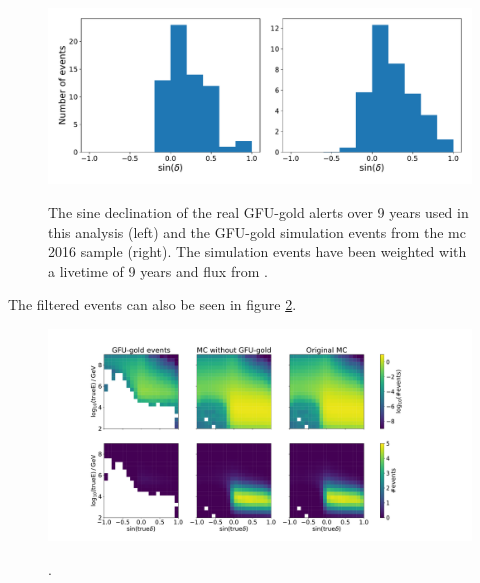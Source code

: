 \begin{figure}
    \centering
    \includegraphics[width=\linewidth]{Plots/03_data/gfu_gold_comp.pdf}
    \label{fig:gfu-gold-comp}
    \caption{The sine declination of the real GFU-gold alerts over 9 years used in this analysis (left) and the GFU-gold simulation events from the mc 2016 sample (right). The simulation events have been weighted with a livetime of 9 years and flux from \cite{flux}.}
\end{figure}

The filtered events can also be seen in figure \ref{fig:energy}.

\begin{figure}
    \centering
    \includegraphics[width=\linewidth]{Plots/03_data/cleaned_mc_energy_test.pdf}
    \label{fig:energy}
    \caption{.}
\end{figure}
